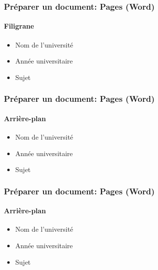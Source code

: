 \documentclass[xcolor=table]{beamer}
\begin{document}
\begin{frame}[t]
\frametitle{Préparer un document: Pages (Word)}
\framesubtitle{Filigrane}

\begin{minipage}{0.43\textwidth}
	\begin{itemize}
		\item Nom de l'université 
		\item Année universitaire
		\item Sujet
	\end{itemize}
\end{minipage}
\begin{minipage}{0.55\textwidth}
\end{minipage}

\end{frame}

\begin{frame}[t]
\frametitle{Préparer un document: Pages (Word)}
\framesubtitle{Arrière-plan}

\begin{minipage}{0.43\textwidth}
	\begin{itemize}
		\item Nom de l'université 
		\item Année universitaire
		\item Sujet
	\end{itemize}
\end{minipage}
\begin{minipage}{0.55\textwidth}
\end{minipage}

\end{frame}

\begin{frame}[t]
\frametitle{Préparer un document: Pages (Word)}
\framesubtitle{Arrière-plan}

\begin{minipage}{0.43\textwidth}
	\begin{itemize}
		\item Nom de l'université 
		\item Année universitaire
		\item Sujet
	\end{itemize}
\end{minipage}
\begin{minipage}{0.55\textwidth}
\end{minipage}

\end{frame}
\end{document}
